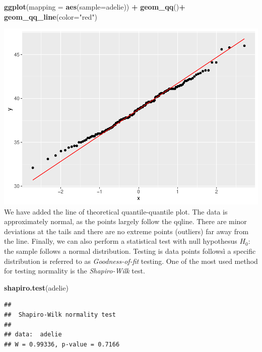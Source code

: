 \documentclass[
]{article}
\newenvironment{Shaded}{\begin{snugshade}}{\end{snugshade}}
\newcommand{\AttributeTok}[1]{\textcolor[rgb]{0.13,0.29,0.53}{#1}}
\newcommand{\FunctionTok}[1]{\textcolor[rgb]{0.13,0.29,0.53}{\textbf{#1}}}
\newcommand{\NormalTok}[1]{#1}
\newcommand{\SpecialCharTok}[1]{\textcolor[rgb]{0.81,0.36,0.00}{\textbf{#1}}}
\newcommand{\StringTok}[1]{\textcolor[rgb]{0.31,0.60,0.02}{#1}}
\begin{document}
\begin{Shaded}
\begin{Highlighting}[]
\FunctionTok{ggplot}\NormalTok{(}\AttributeTok{mapping =} \FunctionTok{aes}\NormalTok{(}\AttributeTok{sample=}\NormalTok{adelie)) }\SpecialCharTok{+} 
  \FunctionTok{geom\_qq}\NormalTok{()}\SpecialCharTok{+}
  \FunctionTok{geom\_qq\_line}\NormalTok{(}\AttributeTok{color=}\StringTok{"red"}\NormalTok{)}
\end{Highlighting}
\end{Shaded}

\includegraphics{Tests_and_Applications_files/figure-latex/unnamed-chunk-7-1.pdf}
We have added the line of theoretical quantile-quantile plot. The data
is approximately normal, as the points largely follow the qqline. There
are minor deviations at the tails and there are no extreme points
(outliers) far away from the line. Finally, we can also perform a
statistical test with null hypothesus \(H_0\): the sample follows a
normal distribution. Testing is data points followsì a specific
distribution is referred to as \emph{Goodness-of-fit} testing. One of
the most used method for testing normality is the \emph{Shapiro-Wilk}
test.

\begin{Shaded}
\begin{Highlighting}[]
\FunctionTok{shapiro.test}\NormalTok{(adelie)}
\end{Highlighting}
\end{Shaded}

\begin{verbatim}
## 
##  Shapiro-Wilk normality test
## 
## data:  adelie
## W = 0.99336, p-value = 0.7166
\end{verbatim}
\end{document}
